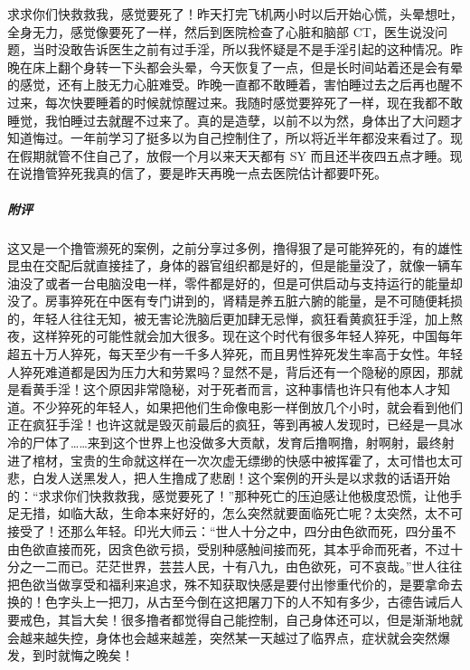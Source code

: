\begin{case}
    求求你们快救救我，感觉要死了！昨天打完飞机两小时以后开始心慌，头晕想吐，全身无力，感觉像要死了一样，然后到医院检查了心脏和脑部 CT，医生说没问题，当时没敢告诉医生之前有过手淫，所以我怀疑是不是手淫引起的这种情况。昨晚在床上翻个身转一下头都会头晕，今天恢复了一点，但是长时间站着还是会有晕的感觉，还有上肢无力心脏难受。昨晚一直都不敢睡着，害怕睡过去之后再也醒不过来，每次快要睡着的时候就惊醒过来。我随时感觉要猝死了一样，现在我都不敢睡觉，我怕睡过去就醒不过来了。真的是造孽，以前不以为然，身体出了大问题才知道悔过。一年前学习了挺多以为自己控制住了，所以将近半年都没来看过了。现在假期就管不住自己了，放假一个月以来天天都有 SY 而且还半夜四五点才睡。现在说撸管猝死我真的信了，要是昨天再晚一点去医院估计都要吓死。
    \subparagraph{附评} 这又是一个撸管濒死的案例，之前分享过多例，撸得狠了是可能猝死的，有的雄性昆虫在交配后就直接挂了，身体的器官组织都是好的，但是能量没了，就像一辆车油没了或者一台电脑没电一样，零件都是好的，但是可供启动与支持运行的能量却没了。房事猝死在中医有专门讲到的，肾精是养五脏六腑的能量，是不可随便耗损的，年轻人往往无知，被无害论洗脑后更加肆无忌惮，疯狂看黄疯狂手淫，加上熬夜，这样猝死的可能性就会加大很多。现在这个时代有很多年轻人猝死，中国每年超五十万人猝死，每天至少有一千多人猝死，而且男性猝死发生率高于女性。年轻人猝死难道都是因为压力大和劳累吗？显然不是，背后还有一个隐秘的原因，那就是看黄手淫！这个原因非常隐秘，对于死者而言，这种事情也许只有他本人才知道。不少猝死的年轻人，如果把他们生命像电影一样倒放几个小时，就会看到他们正在疯狂手淫！也许这就是毁灭前最后的疯狂，等到再被人发现时，已经是一具冰冷的尸体了……来到这个世界上也没做多大贡献，发育后撸啊撸，射啊射，最终射进了棺材，宝贵的生命就这样在一次次虚无缥缈的快感中被挥霍了，太可惜也太可悲，白发人送黑发人，把人生撸成了悲剧！这个案例的开头是以求救的话语开始的：“求求你们快救救我，感觉要死了！”那种死亡的压迫感让他极度恐慌，让他手足无措，如临大敌，生命本来好好的，怎么突然就要面临死亡呢？太突然，太不可接受了！还那么年轻。印光大师云：“世人十分之中，四分由色欲而死，四分虽不由色欲直接而死，因贪色欲亏损，受别种感触间接而死，其本乎命而死者，不过十分之一二而已。茫茫世界，芸芸人民，十有八九，由色欲死，可不哀哉。”世人往往把色欲当做享受和福利来追求，殊不知获取快感是要付出惨重代价的，是要拿命去换的！色字头上一把刀，从古至今倒在这把屠刀下的人不知有多少，古德告诫后人要戒色，其旨大矣！很多撸者都觉得自己能控制，自己身体还可以，但是渐渐地就会越来越失控，身体也会越来越差，突然某一天越过了临界点，症状就会突然爆发，到时就悔之晚矣！
\end{case}

